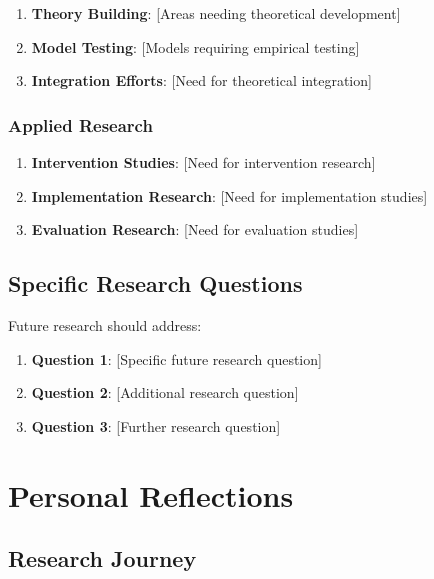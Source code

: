 \documentclass[
  12pt,
  letterpaper,
  12pt,
  letterpaper,
  oneside]{report}
\providecommand{\tightlist}{%
  \setlength{\itemsep}{0pt}\setlength{\parskip}{0pt}}
\begin{document}
\begin{enumerate}
\def\labelenumi{\arabic{enumi}.}
\tightlist
\item
  \textbf{Theory Building}: {[}Areas needing theoretical development{]}
\item
  \textbf{Model Testing}: {[}Models requiring empirical testing{]}
\item
  \textbf{Integration Efforts}: {[}Need for theoretical integration{]}
\end{enumerate}

\subsubsection{Applied Research}\label{applied-research}

\begin{enumerate}
\def\labelenumi{\arabic{enumi}.}
\tightlist
\item
  \textbf{Intervention Studies}: {[}Need for intervention research{]}
\item
  \textbf{Implementation Research}: {[}Need for implementation
  studies{]}
\item
  \textbf{Evaluation Research}: {[}Need for evaluation studies{]}
\end{enumerate}

\subsection{Specific Research
Questions}\label{specific-research-questions-1}

Future research should address:

\begin{enumerate}
\def\labelenumi{\arabic{enumi}.}
\tightlist
\item
  \textbf{Question 1}: {[}Specific future research question{]}
\item
  \textbf{Question 2}: {[}Additional research question{]}
\item
  \textbf{Question 3}: {[}Further research question{]}
\end{enumerate}

\section{Personal Reflections}\label{personal-reflections}

\subsection{Research Journey}\label{research-journey}
\end{document}
